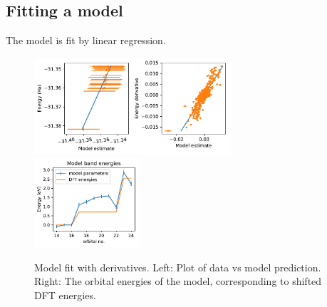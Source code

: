 \subsection{Fitting a model}

The model is fit by linear regression.

\begin{figure}[h!]
\includegraphics[width=0.65\textwidth]{images/dmc_allderivs_lowen_model.pdf}
\includegraphics[width=0.35\textwidth]{images/dmc_allderivs_lowen_model_bands.pdf}
\label{fig:model_fit}
\caption{Model fit with derivatives. 
Left: Plot of data vs model prediction. 
Right: The orbital energies of the model, corresponding to shifted DFT energies.}
\end{figure}

  
  






